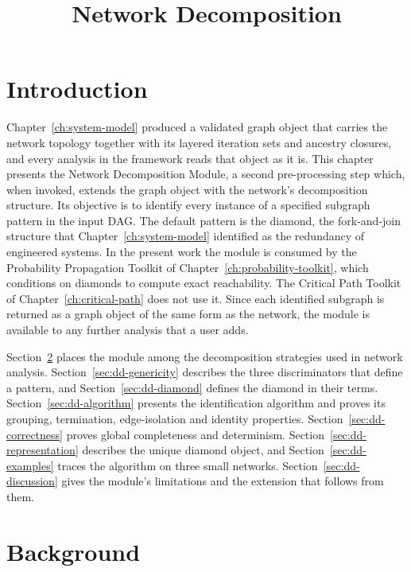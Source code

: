 \documentclass[12pt]{report}
\begin{document}
\title{Network Decomposition}
\fi

\newcommand{\infl}{\mathrm{infl}}
\newcommand{\Anc}{\mathrm{Anc}}
\newcommand{\topi}{\mathrm{topi}}
\newcommand{\hkey}{\mathrm{hkey}}
\newcommand{\ED}{\mathcal{E}_D}



\section{Introduction}
\label{sec:dd-intro}

Chapter~\ref{ch:system-model} produced a validated graph object that carries the network
topology together with its layered iteration sets and ancestry closures, and every analysis in
the framework reads that object as it is. This chapter presents the Network Decomposition
Module, a second pre-processing step which, when invoked, extends the graph object with the
network's decomposition structure. Its objective is to identify every instance of a specified
subgraph pattern in the input DAG. The default pattern is the diamond, the fork-and-join
structure that Chapter~\ref{ch:system-model} identified as the redundancy of
engineered systems. In the present work the module is consumed by the Probability Propagation
Toolkit of Chapter~\ref{ch:probability-toolkit}, which conditions on diamonds to compute
exact reachability. The Critical Path Toolkit of Chapter~\ref{ch:critical-path} does not use
it. Since each identified subgraph is returned as a graph object of the same form as the
network, the module is available to any further analysis that a user adds.

Section~\ref{sec:dd-family} places the module among the decomposition strategies used in
network analysis. Section~\ref{sec:dd-genericity} describes the three discriminators that
define a pattern, and Section~\ref{sec:dd-diamond} defines the diamond in their terms.
Section~\ref{sec:dd-algorithm} presents the identification algorithm and proves its grouping,
termination, edge-isolation and identity properties. Section~\ref{sec:dd-correctness} proves
global completeness and determinism. Section~\ref{sec:dd-representation} describes the unique
diamond object, and Section~\ref{sec:dd-examples} traces the algorithm on three small
networks. Section~\ref{sec:dd-discussion} gives the module's limitations and the extension
that follows from them.

\section{Background}
\label{sec:dd-family}
\end{document}
